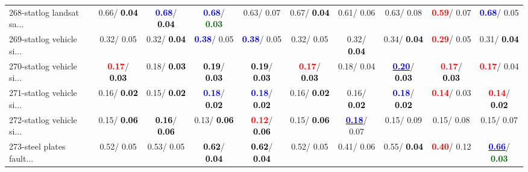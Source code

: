 \begin{table}[h]
\begin{center}
{\begin{tabular}{lc|c|c|c|c|c|c|c|c}
268-statlog landsat sa... &   0.66/\textcolor{black}{\textbf{  0.04}} & \textcolor{blue}{\textbf{  0.68}}/\textcolor{black}{\textbf{  0.04}} & \textcolor{blue}{\textbf{  0.68}}/\textcolor{darkgreen}{\textbf{  0.03}} &   0.63/  0.07 &   0.67/\textcolor{black}{\textbf{  0.04}} &   0.61/  0.06 &   0.63/  0.08 & \textcolor{red}{\textbf{  0.59}}/  0.07 & \textcolor{blue}{\textbf{  0.68}}/  0.05 \\
269-statlog vehicle si... &   0.32/  0.05 &   0.32/\textcolor{black}{\textbf{  0.04}} & \textcolor{blue}{\textbf{  0.38}}/  0.05 & \textcolor{blue}{\textbf{  0.38}}/  0.05 &   0.32/  0.05 &   0.32/\textcolor{black}{\textbf{  0.04}} &   0.34/\textcolor{black}{\textbf{  0.04}} & \textcolor{red}{\textbf{  0.29}}/  0.05 &   0.31/\textcolor{black}{\textbf{  0.04}} \\
270-statlog vehicle si... & \textcolor{red}{\textbf{  0.17}}/\textcolor{black}{\textbf{  0.03}} &   0.18/\textcolor{black}{\textbf{  0.03}} & \textcolor{black}{\textbf{  0.19}}/\textcolor{black}{\textbf{  0.03}} & \textcolor{black}{\textbf{  0.19}}/\textcolor{black}{\textbf{  0.03}} & \textcolor{red}{\textbf{  0.17}}/\textcolor{black}{\textbf{  0.03}} &   0.18/  0.04 & \underline{\textcolor{blue}{\textbf{  0.20}}}/\textcolor{black}{\textbf{  0.03}} & \textcolor{red}{\textbf{  0.17}}/\textcolor{black}{\textbf{  0.03}} & \textcolor{red}{\textbf{  0.17}}/  0.04 \\ \hline
271-statlog vehicle si... &   0.16/\textcolor{black}{\textbf{  0.02}} &   0.15/\textcolor{black}{\textbf{  0.02}} & \textcolor{blue}{\textbf{  0.18}}/\textcolor{black}{\textbf{  0.02}} & \textcolor{blue}{\textbf{  0.18}}/\textcolor{black}{\textbf{  0.02}} &   0.16/\textcolor{black}{\textbf{  0.02}} &   0.16/\textcolor{black}{\textbf{  0.02}} & \textcolor{blue}{\textbf{  0.18}}/\textcolor{black}{\textbf{  0.02}} & \textcolor{red}{\textbf{  0.14}}/  0.03 & \textcolor{red}{\textbf{  0.14}}/\textcolor{black}{\textbf{  0.02}} \\
272-statlog vehicle si... &   0.15/\textcolor{black}{\textbf{  0.06}} & \textcolor{black}{\textbf{  0.16}}/\textcolor{black}{\textbf{  0.06}} &   0.13/\textcolor{black}{\textbf{  0.06}} & \textcolor{red}{\textbf{  0.12}}/\textcolor{black}{\textbf{  0.06}} &   0.15/\textcolor{black}{\textbf{  0.06}} & \underline{\textcolor{blue}{\textbf{  0.18}}}/  0.07 &   0.15/  0.09 &   0.15/  0.08 &   0.15/  0.07 \\
273-steel plates fault... &   0.52/  0.05 &   0.53/  0.05 & \textcolor{black}{\textbf{  0.62}}/\textcolor{black}{\textbf{  0.04}} & \textcolor{black}{\textbf{  0.62}}/\textcolor{black}{\textbf{  0.04}} &   0.52/  0.05 &   0.41/  0.06 &   0.55/\textcolor{black}{\textbf{  0.04}} & \textcolor{red}{\textbf{  0.40}}/  0.12 & \underline{\textcolor{blue}{\textbf{  0.66}}}/\textcolor{darkgreen}{\textbf{  0.03}} \\

\end{tabular}}
\end{center}
\end{table}
